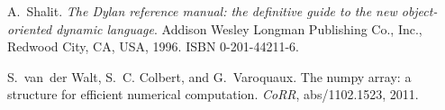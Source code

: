 \documentclass[9pt]{sigplanconf}
\begin{document}
\begin{thebibliography}{16}
A.~Shalit.
\newblock \emph{The Dylan reference manual: the definitive guide to the new
  object-oriented dynamic language}.
\newblock Addison Wesley Longman Publishing Co., Inc., Redwood City, CA, USA,
  1996.
\newblock ISBN 0-201-44211-6.

S.~van~der Walt, S.~C. Colbert, and G.~Varoquaux.
\newblock The numpy array: a structure for efficient numerical computation.
\newblock \emph{CoRR}, abs/1102.1523, 2011.

\end{thebibliography}
\end{document}
